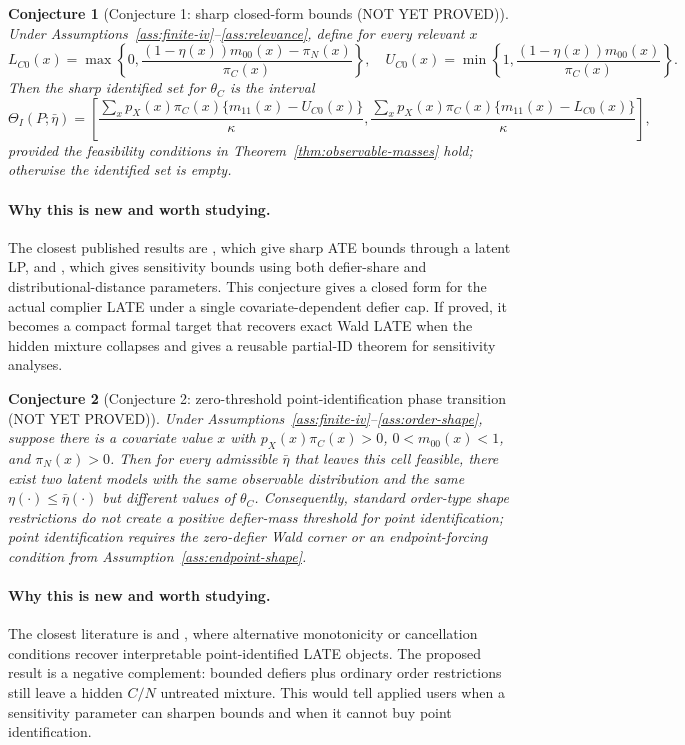 \documentclass[11pt]{article}
\theoremstyle{definition}
\theoremstyle{plain}
\newtheorem{conjecture}{Conjecture}
\theoremstyle{remark}
\begin{document}
\begin{conjecture}[Conjecture 1: sharp closed-form bounds (NOT YET PROVED)]\label{conj:sharp-bounds}
Under Assumptions~\ref{ass:finite-iv}--\ref{ass:relevance}, define for every relevant \(x\)
\[
L_{C0}(x)=
\max\left\{0,\frac{(1-\eta(x))m_{00}(x)-\pi_N(x)}{\pi_C(x)}\right\},
\quad
U_{C0}(x)=
\min\left\{1,\frac{(1-\eta(x))m_{00}(x)}{\pi_C(x)}\right\}.
\]
Then the sharp identified set for \(\theta_C\) is the interval
\[
\Theta_I(P;\bar\eta)=
\left[
\frac{\sum_x p_X(x)\pi_C(x)\{m_{11}(x)-U_{C0}(x)\}}{\kappa},
\frac{\sum_x p_X(x)\pi_C(x)\{m_{11}(x)-L_{C0}(x)\}}{\kappa}
\right],
\]
provided the feasibility conditions in Theorem~\ref{thm:observable-masses} hold; otherwise the identified set is empty.
\end{conjecture}
\paragraph{Why this is new and worth studying.}
The closest published results are \citet{BalkePearl1997}, which give sharp ATE bounds through a latent LP, and \citet{Noack2021}, which gives sensitivity bounds using both defier-share and distributional-distance parameters.  This conjecture gives a closed form for the actual complier LATE under a single covariate-dependent defier cap.  If proved, it becomes a compact formal target that recovers exact Wald LATE when the hidden mixture collapses and gives a reusable partial-ID theorem for sensitivity analyses.

\begin{conjecture}[Conjecture 2: zero-threshold point-identification phase transition (NOT YET PROVED)]\label{conj:zero-threshold}
Under Assumptions~\ref{ass:finite-iv}--\ref{ass:order-shape}, suppose there is a covariate value \(x\) with \(p_X(x)\pi_C(x)>0\), \(0<m_{00}(x)<1\), and \(\pi_N(x)>0\).  Then for every admissible \(\bar\eta\) that leaves this cell feasible, there exist two latent models with the same observable distribution and the same \(\eta(\cdot)\le\bar\eta(\cdot)\) but different values of \(\theta_C\).  Consequently, standard order-type shape restrictions do not create a positive defier-mass threshold for point identification; point identification requires the zero-defier Wald corner or an endpoint-forcing condition from Assumption~\ref{ass:endpoint-shape}.
\end{conjecture}
\paragraph{Why this is new and worth studying.}
The closest literature is \citet{deChaisemartin2017} and \citet{DahlHuberMellace2023}, where alternative monotonicity or cancellation conditions recover interpretable point-identified LATE objects.  The proposed result is a negative complement: bounded defiers plus ordinary order restrictions still leave a hidden \(C/N\) untreated mixture.  This would tell applied users when a sensitivity parameter can sharpen bounds and when it cannot buy point identification.
\end{document}
